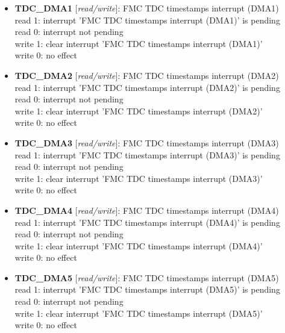 \begin{itemize}
\begin{small}
\end{small}
\item \begin{small}
{\bf 
TDC\_DMA1
} [\emph{read/write}]: FMC TDC timestamps interrupt (DMA1)
\\
read 1: interrupt 'FMC TDC timestamps interrupt (DMA1)' is pending\\read 0: interrupt not pending\\write 1: clear interrupt 'FMC TDC timestamps interrupt (DMA1)'\\write 0: no effect
\end{small}
\item \begin{small}
{\bf 
TDC\_DMA2
} [\emph{read/write}]: FMC TDC timestamps interrupt (DMA2)
\\
read 1: interrupt 'FMC TDC timestamps interrupt (DMA2)' is pending\\read 0: interrupt not pending\\write 1: clear interrupt 'FMC TDC timestamps interrupt (DMA2)'\\write 0: no effect
\end{small}
\item \begin{small}
{\bf 
TDC\_DMA3
} [\emph{read/write}]: FMC TDC timestamps interrupt (DMA3)
\\
read 1: interrupt 'FMC TDC timestamps interrupt (DMA3)' is pending\\read 0: interrupt not pending\\write 1: clear interrupt 'FMC TDC timestamps interrupt (DMA3)'\\write 0: no effect
\end{small}
\item \begin{small}
{\bf 
TDC\_DMA4
} [\emph{read/write}]: FMC TDC timestamps interrupt (DMA4)
\\
read 1: interrupt 'FMC TDC timestamps interrupt (DMA4)' is pending\\read 0: interrupt not pending\\write 1: clear interrupt 'FMC TDC timestamps interrupt (DMA4)'\\write 0: no effect
\end{small}
\item \begin{small}
{\bf 
TDC\_DMA5
} [\emph{read/write}]: FMC TDC timestamps interrupt (DMA5)
\\
read 1: interrupt 'FMC TDC timestamps interrupt (DMA5)' is pending\\read 0: interrupt not pending\\write 1: clear interrupt 'FMC TDC timestamps interrupt (DMA5)'\\write 0: no effect
\end{small}
\end{itemize}


